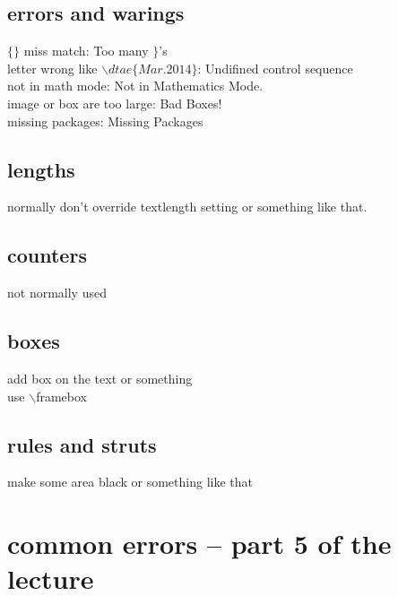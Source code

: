 \documentclass[11pt,a4paper]{book}
\begin{document}
{  \section{errors and warings}{
    $\{\}$ miss match: Too many $\}$'s \\
    letter wrong like $\backslash dtae\{Mar.2014\}$: Undifined control sequence\\
    not in math mode: Not in Mathematics Mode. \\
    image or box are too large: Bad Boxes! \\
    missing packages: Missing Packages \\
  }
  
  \section{lengths}{
    normally don't override textlength setting or something like that.
  }
  \section{counters}{not normally used}
  \section{boxes}{
    add box on the text or something \\
    use $\backslash$framebox
  }
  \section{rules and struts}{
    make some area black or something like that
  }

}

\chapter{common errors -- part 5 of the lecture}{
  
}
\end{document}
